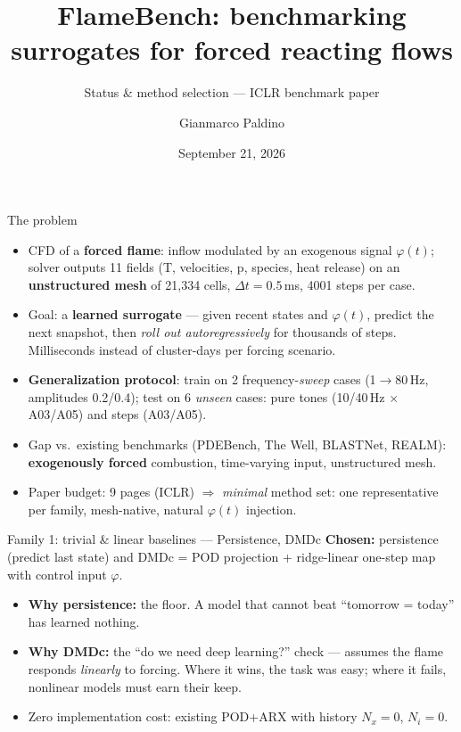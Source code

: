 \documentclass[10pt]{beamer}
\title[FlameBench status]{FlameBench: benchmarking surrogates for forced reacting flows}
\subtitle{Status \& method selection --- ICLR benchmark paper}
\author{Gianmarco Paldino}
\date{September 21, 2026}
\begin{document}
\begin{frame}
  \titlepage
\end{frame}

\begin{frame}{The problem}
  \begin{itemize}
    \item CFD of a \textbf{forced flame}: inflow modulated by an exogenous signal $\varphi(t)$;
          solver outputs 11 fields (T, velocities, p, species, heat release) on an
          \textbf{unstructured mesh} of 21{,}334 cells, $\Delta t = 0.5$\,ms, 4001 steps per case.
    \item Goal: a \textbf{learned surrogate} --- given recent states and $\varphi(t)$, predict the
          next snapshot, then \emph{roll out autoregressively} for thousands of steps.
          Milliseconds instead of cluster-days per forcing scenario.
    \item \textbf{Generalization protocol}: train on 2 frequency-\emph{sweep} cases
          (1$\to$80\,Hz, amplitudes 0.2/0.4); test on 6 \emph{unseen} cases:
          pure tones (10/40\,Hz $\times$ A03/A05) and steps (A03/A05).
    \item Gap vs.\ existing benchmarks (PDEBench, The Well, BLASTNet, REALM):
          \textbf{exogenously forced} combustion, time-varying input, unstructured mesh.
    \item Paper budget: 9 pages (ICLR) $\Rightarrow$ \emph{minimal} method set:
          one representative per family, mesh-native, natural $\varphi(t)$ injection.
  \end{itemize}
\end{frame}

\begin{frame}{Family 1: trivial \& linear baselines --- Persistence, DMDc}
  \textbf{Chosen:} persistence (predict last state) and DMDc = POD projection + ridge-linear
  one-step map with control input $\varphi$.
  \begin{itemize}
    \item \textbf{Why persistence:} the floor. A model that cannot beat ``tomorrow = today''
          has learned nothing.
    \item \textbf{Why DMDc:} the ``do we need deep learning?'' check --- assumes the flame
          responds \emph{linearly} to forcing. Where it wins, the task was easy; where it
          fails, nonlinear models must earn their keep.
    \item Zero implementation cost: existing POD+ARX with history $N_x{=}0$, $N_i{=}0$.
  \end{itemize}
\end{frame}
\end{document}
